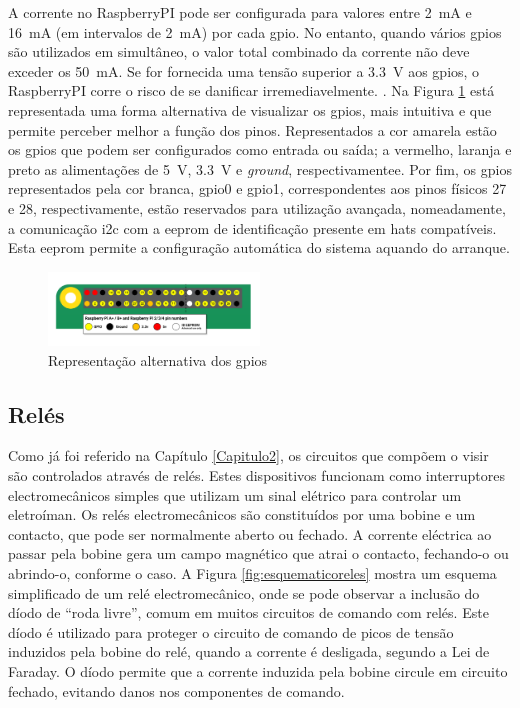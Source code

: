 A corrente no \gls{RaspberryPI} pode ser configurada para valores entre \SI{2}{\milli\ampere} e \SI{16}{\milli\ampere} (em intervalos de \SI{2}{\milli\ampere}) por cada \acrshort{gpio}. No entanto, quando vários \acrshort{gpio}s são utilizados em simultâneo, o valor total combinado da corrente não deve exceder os \SI{50}{\milli\ampere}. Se for fornecida uma tensão superior a \SI{3.3}{\volt} aos \acrshort{gpio}s, o \gls{RaspberryPI} corre o risco de se danificar irremediavelmente. \cite{Raspberrytech}. Na Figura \ref{fig:gpiocores} está representada uma forma alternativa de visualizar os \acrshort{gpio}s, mais intuitiva e que permite perceber melhor a função dos pinos. Representados a cor amarela estão os \acrshort{gpio}s que podem ser configurados como entrada ou saída; a vermelho, laranja e preto as alimentações de \SI{5}{\volt}, \SI{3.3}{\volt} e \textit{ground}, respectivamentee. Por fim, os \acrshort{gpio}s representados pela cor branca, \acrshort{gpio}0  e \acrshort{gpio}1, correspondentes aos pinos físicos 27 e 28, respectivamente, estão reservados para utilização avançada, nomeadamente, a comunicação \acrshort{i2c} com a \gls{eeprom} de identificação presente em \gls{hat}s compatíveis. Esta \gls{eeprom} permite a configuração automática do sistema aquando do arranque. 

\begin{figure}[hbtp]
    \centering
    \includegraphics[width=0.5\textwidth]{figures/GPIO.png}
    \caption{Representação alternativa dos \acrshort{gpio}s \cite{Raspberrytech}}
    \label{fig:gpiocores}
\end{figure}

\subsection{Relés}
\label{sec:reles}
Como já foi referido na Capítulo \ref{Capitulo2}, os circuitos que compõem o \acrshort{visir} são controlados através de relés. Estes dispositivos funcionam como interruptores electromecânicos simples que utilizam um sinal elétrico para controlar um eletroíman.
Os relés electromecânicos são constituídos por uma bobine e um contacto, que pode ser normalmente aberto ou fechado. A corrente eléctrica ao passar pela bobine gera um campo magnético que atrai o contacto, fechando-o ou abrindo-o, conforme o caso. A Figura \ref{fig:esquematicoreles} mostra um esquema simplificado de um relé electromecânico, onde se pode observar a inclusão do díodo de ``roda livre'', comum em muitos circuitos de comando com relés. Este díodo é utilizado para proteger o circuito de comando de picos de tensão induzidos pela bobine do relé, quando a corrente é desligada, segundo a Lei de Faraday. O díodo permite que a corrente induzida pela bobine circule em circuito fechado, evitando danos nos componentes de comando. 

